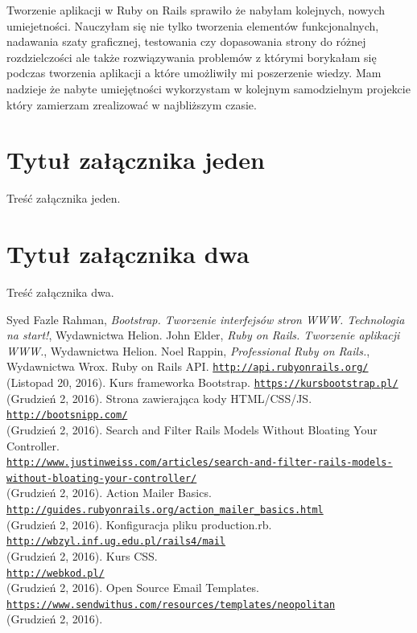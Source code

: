 \documentclass[openright]{xmgr}
\begin{document}
	
	\summary
	Tworzenie aplikacji w Ruby on Rails sprawiło że nabyłam kolejnych, nowych umiejetności.  Nauczyłam się nie tylko tworzenia elementów funkcjonalnych, nadawania szaty graficznej, testowania czy dopasowania strony do różnej rozdzielczości ale także rozwiązywania problemów z którymi borykałam się podczas tworzenia aplikacji a które umożliwiły mi poszerzenie wiedzy. Mam nadzieje że nabyte umiejętności wykorzystam w kolejnym samodzielnym projekcie który zamierzam zrealizować w najbliższym czasie.   
	
	\appendix
	\chapter{Tytuł załącznika jeden}
	
	Treść załącznika jeden.
	
	\chapter{Tytuł załącznika dwa}
	
	Treść załącznika dwa.
	
	\begin{thebibliography}{11}
		 Syed Fazle Rahman, \emph{Bootstrap. Tworzenie interfejsów stron WWW. Technologia na start!}, Wydawnictwa Helion.
		 John Elder, \emph{Ruby on Rails. Tworzenie aplikacji WWW.}, Wydawnictwa Helion.
		 Noel Rappin, \emph{Professional Ruby on Rails.}, Wydawnictwa Wrox.
		Ruby on Rails API. \texttt{\url{http://api.rubyonrails.org/}} \\(Listopad 20, 2016).
		Kurs frameworka Bootstrap. \texttt{\url{https://kursbootstrap.pl/}} \\(Grudzień 2, 2016).
		Strona zawierająca kody HTML/CSS/JS. \texttt{\url{http://bootsnipp.com/}} \\(Grudzień 2, 2016).
		Search and Filter Rails Models Without Bloating Your Controller. \\\texttt{\url{http://www.justinweiss.com/articles/search-and-filter-rails-models-without-bloating-your-controller/}} \\(Grudzień 2, 2016).
		Action Mailer Basics. \\\texttt{\url{http://guides.rubyonrails.org/action_mailer_basics.html}} \\(Grudzień 2, 2016).
		Konfiguracja pliku production.rb. \\\texttt{\url{http://wbzyl.inf.ug.edu.pl/rails4/mail}} \\(Grudzień 2, 2016).
		Kurs CSS. \\\texttt{\url{http://webkod.pl/}} \\(Grudzień 2, 2016).
		Open Source Email Templates. \\\texttt{\url{https://www.sendwithus.com/resources/templates/neopolitan}} \\(Grudzień 2, 2016).
	\end{thebibliography}
	\listoffigures
	
	\lstlistoflistings
	
	\oswiadczenie
	
\end{document}
